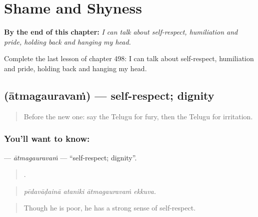 
\chapter{Shame and Shyness}
\label{ch:te-shame-and-shyness}

\begin{chapteropening}
\textbf{By the end of this chapter:} \emph{I can talk about self-respect, humiliation and pride, holding back and hanging my head.}

Complete the last lesson of chapter 498: I can talk about self-respect, humiliation and pride, holding back and hanging my head.
\end{chapteropening}

\section[\texorpdfstring{\te{ఆత్మగౌరవం} (ātmagauravaṁ)}{ఆత్మగౌరవం (ātmagauravaṁ)}]{ (ātmagauravaṁ) — self-respect; dignity}

\label{lesson:TE-C498-atmagauravam}



\begin{quote}
Before the new one: say the Telugu for fury, then the Telugu for irritation.
\end{quote}

\subsection*{You'll want to know: }
\textbf{} — \emph{ātmagauravaṁ} — \textquotedblleft{}self-respect; dignity\textquotedblright{}.

\begin{quote}
   .
\end{quote}

\begin{quote}
\emph{pēdavāḍainā ataniki ātmagauravaṁ ekkuva.}
\end{quote}

\begin{quote}
Though he is poor, he has a strong sense of self-respect.
\end{quote}

